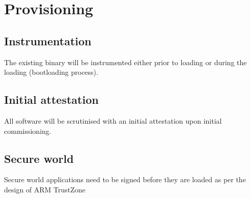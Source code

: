 \section{Provisioning}

\subsection{Instrumentation}

The existing binary will be instrumented either prior to loading or during the loading (bootloading process).

\subsection{Initial attestation}

All software will be scrutinised with an initial attestation upon initial commissioning.

\subsection{Secure world}

Secure world applications need to be signed before they are loaded as per the design of ARM TrustZone

